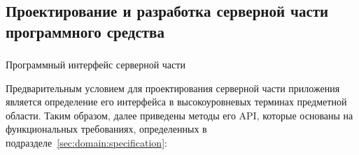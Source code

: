 \subsection{Проектирование и разработка серверной части программного средства}
\label{sec:design:server}

\subsubsection{} Программный интерфейс серверной части
\label{sec:design:server:interface}

Предварительным условием для проектирования серверной части приложения является определение его интерфейса в высокоуровневых терминах предметной области. Таким образом, далее приведены методы его API, которые основаны на функциональных требованиях, определенных в подразделе~\ref{sec:domain:specification}:


